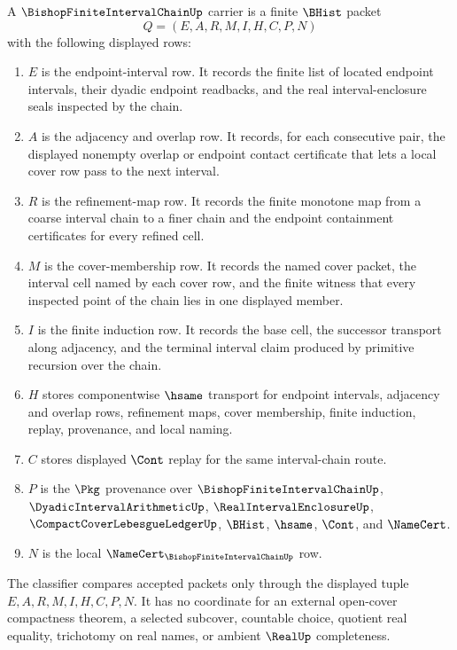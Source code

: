 \begin{definition}
\label{def:bishop-finite-interval-chain-carrier}
A $\BishopFiniteIntervalChainUp$ carrier is a finite $\BHist$ packet
$$
Q=(E,A,R,M,I,H,C,P,N)
$$
with the following displayed rows:
\begin{enumerate}
\item $E$ is the endpoint-interval row. It records the finite list of located endpoint intervals, their dyadic endpoint readbacks, and the real interval-enclosure seals inspected by the chain.
\item $A$ is the adjacency and overlap row. It records, for each consecutive pair, the displayed nonempty overlap or endpoint contact certificate that lets a local cover row pass to the next interval.
\item $R$ is the refinement-map row. It records the finite monotone map from a coarse interval chain to a finer chain and the endpoint containment certificates for every refined cell.
\item $M$ is the cover-membership row. It records the named cover packet, the interval cell named by each cover row, and the finite witness that every inspected point of the chain lies in one displayed member.
\item $I$ is the finite induction row. It records the base cell, the successor transport along adjacency, and the terminal interval claim produced by primitive recursion over the chain.
\item $H$ stores componentwise $\hsame$ transport for endpoint intervals, adjacency and overlap rows, refinement maps, cover membership, finite induction, replay, provenance, and local naming.
\item $C$ stores displayed $\Cont$ replay for the same interval-chain route.
\item $P$ is the $\Pkg$ provenance over $\BishopFiniteIntervalChainUp$, $\DyadicIntervalArithmeticUp$, $\RealIntervalEnclosureUp$, $\CompactCoverLebesgueLedgerUp$, $\BHist$, $\hsame$, $\Cont$, and $\NameCert$.
\item $N$ is the local $\NameCert_{\BishopFiniteIntervalChainUp}$ row.
\end{enumerate}
The classifier compares accepted packets only through the displayed tuple $E,A,R,M,I,H,C,P,N$. It has no coordinate for an external open-cover compactness theorem, a selected subcover, countable choice, quotient real equality, trichotomy on real names, or ambient $\RealUp$ completeness.
\end{definition}

